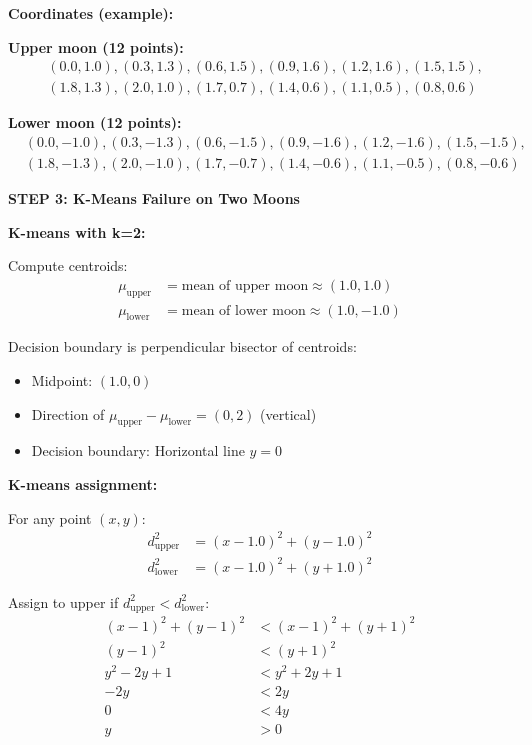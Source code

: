 \documentclass[12pt]{article}
\begin{document}
\begin{solution}
\textbf{Coordinates (example):}

\textbf{Upper moon (12 points):}
\begin{align*}
&(0.0, 1.0), (0.3, 1.3), (0.6, 1.5), (0.9, 1.6), (1.2, 1.6), (1.5, 1.5), \\
&(1.8, 1.3), (2.0, 1.0), (1.7, 0.7), (1.4, 0.6), (1.1, 0.5), (0.8, 0.6)
\end{align*}

\textbf{Lower moon (12 points):}
\begin{align*}
&(0.0, -1.0), (0.3, -1.3), (0.6, -1.5), (0.9, -1.6), (1.2, -1.6), (1.5, -1.5), \\
&(1.8, -1.3), (2.0, -1.0), (1.7, -0.7), (1.4, -0.6), (1.1, -0.5), (0.8, -0.6)
\end{align*}

\textbf{STEP 3: K-Means Failure on Two Moons}

\textbf{K-means with k=2:}

Compute centroids:
\begin{align*}
\mu_{\text{upper}} &= \text{mean of upper moon} \approx (1.0, 1.0) \\
\mu_{\text{lower}} &= \text{mean of lower moon} \approx (1.0, -1.0)
\end{align*}

Decision boundary is perpendicular bisector of centroids:
\begin{itemize}
    \item Midpoint: $(1.0, 0)$
    \item Direction of $\mu_{\text{upper}} - \mu_{\text{lower}} = (0, 2)$ (vertical)
    \item Decision boundary: Horizontal line $y = 0$
\end{itemize}

\textbf{K-means assignment:}

For any point $(x, y)$:
\begin{align*}
d_{\text{upper}}^2 &= (x - 1.0)^2 + (y - 1.0)^2 \\
d_{\text{lower}}^2 &= (x - 1.0)^2 + (y + 1.0)^2
\end{align*}

Assign to upper if $d_{\text{upper}}^2 < d_{\text{lower}}^2$:
\begin{align*}
(x-1)^2 + (y-1)^2 &< (x-1)^2 + (y+1)^2 \\
(y-1)^2 &< (y+1)^2 \\
y^2 - 2y + 1 &< y^2 + 2y + 1 \\
-2y &< 2y \\
0 &< 4y \\
y &> 0
\end{align*}


\end{solution}
\end{document}
